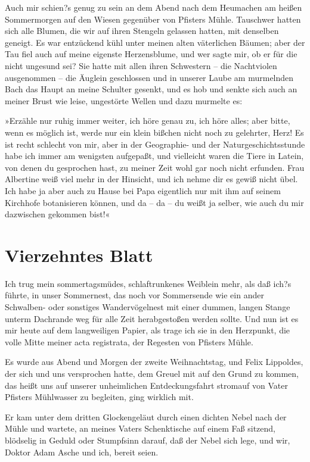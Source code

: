 Auch mir schien?s genug zu sein an dem Abend nach dem Heumachen am
heißen Sommermorgen auf den Wiesen gegenüber von Pfisters Mühle.
Tauschwer hatten sich alle Blumen, die wir auf ihren Stengeln
gelassen hatten, mit denselben geneigt. Es war entzückend kühl
unter meinen alten väterlichen Bäumen; aber der Tau fiel auch auf
meine eigenste Herzensblume, und wer sagte mir, ob er für die nicht
ungesund sei? Sie hatte mit allen ihren Schwestern – die
Nachtviolen ausgenommen – die Äuglein geschlossen und in unserer
Laube am murmelnden Bach das Haupt an meine Schulter gesenkt, und
es hob und senkte sich auch an meiner Brust wie leise, ungestörte
Wellen und dazu murmelte es:

»Erzähle nur ruhig immer weiter, ich höre genau zu, ich höre alles;
aber bitte, wenn es möglich ist, werde nur ein klein bißchen nicht
noch zu gelehrter, Herz! Es ist recht schlecht von mir, aber in der
Geographie- und der Naturgeschichtsstunde habe ich immer am
wenigsten aufgepaßt, und vielleicht waren die Tiere in Latein, von
denen du gesprochen hast, zu meiner Zeit wohl gar noch nicht
erfunden. Frau Albertine weiß viel mehr in der Hinsicht, und ich
nehme dir es gewiß nicht übel. Ich habe ja aber auch zu Hause bei
Papa eigentlich nur mit ihm auf seinem Kirchhofe botanisieren
können, und da – da – du weißt ja selber, wie auch du mir
dazwischen gekommen bist!«

\section{Vierzehntes Blatt}

Ich trug mein sommertagsmüdes, schlaftrunkenes Weiblein mehr, als
daß ich?s führte, in unser Sommernest, das noch vor Sommersende wie
ein ander Schwalben- oder sonstiges Wandervögelnest mit einer
dummen, langen Stange unterm Dachrande weg für alle Zeit
herabgestoßen werden sollte. Und nun ist es mir heute auf dem
langweiligen Papier, als trage ich sie in den Herzpunkt, die volle
Mitte meiner acta registrata, der Regesten von Pfisters Mühle.

Es wurde aus Abend und Morgen der zweite Weihnachtstag, und Felix
Lippoldes, der sich und uns versprochen hatte, dem Greuel mit auf
den Grund zu kommen, das heißt uns auf unserer unheimlichen
Entdeckungsfahrt stromauf von Vater Pfisters Mühlwasser zu
begleiten, ging wirklich mit.

Er kam unter dem dritten Glockengeläut durch einen dichten Nebel
nach der Mühle und wartete, an meines Vaters Schenktische auf einem
Faß sitzend, blödselig in Geduld oder Stumpfsinn darauf, daß der
Nebel sich lege, und wir, Doktor Adam Asche und ich, bereit seien.

